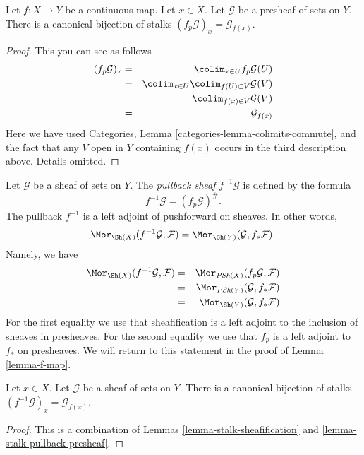 \begin{lemma}
\label{lemma-stalk-pullback-presheaf}
Let $f : X \to Y$ be a continuous map.
Let $x \in X$. Let $\mathcal{G}$ be a presheaf of sets on $Y$.
There is a canonical bijection of stalks
$(f_p\mathcal{G})_x = \mathcal{G}_{f(x)}$.
\end{lemma}

\begin{proof}
This you can see as follows
\begin{eqnarray*}
(f_p\mathcal{G})_x
& = &
\colim_{x \in U} f_p\mathcal{G}(U) \\
& = &
\colim_{x \in U} \colim_{f(U) \subset V} \mathcal{G}(V) \\
& = &
\colim_{f(x) \in V} \mathcal{G}(V) \\
& = &
\mathcal{G}_{f(x)}
\end{eqnarray*}
Here we have used
Categories, Lemma \ref{categories-lemma-colimits-commute},
and the fact that any $V$ open in $Y$ containing $f(x)$
occurs in the third description above. Details omitted.
\end{proof}

\noindent
Let $\mathcal{G}$ be a sheaf of sets on $Y$.
The {\it pullback sheaf} $f^{-1}\mathcal{G}$ is defined
by the formula
$$
f^{-1}\mathcal{G} = (f_p\mathcal{G})^\# .
$$
The pullback $f^{-1}$ is a left adjoint of
pushforward on sheaves. In other words,
$$
\Mor_{\Sh(X)}(f^{-1}\mathcal{G}, \mathcal{F})
=
\Mor_{\Sh(Y)}(\mathcal{G}, f_*\mathcal{F}).
$$
Namely, we have
\begin{eqnarray*}
\Mor_{\Sh(X)}(f^{-1}\mathcal{G}, \mathcal{F})
& = &
\Mor_{\textit{PSh}(X)}(f_p\mathcal{G}, \mathcal{F}) \\
& = &
\Mor_{\textit{PSh}(Y)}(\mathcal{G}, f_*\mathcal{F}) \\
& = &
\Mor_{\Sh(Y)}(\mathcal{G}, f_*\mathcal{F})
\end{eqnarray*}
For the first equality we use that sheafification is a left adjoint
to the inclusion of sheaves in presheaves. For the second equality
we use that $f_p$ is a left adjoint to $f_*$ on presheaves. We will return
to this statement in the proof of Lemma \ref{lemma-f-map}.

\begin{lemma}
\label{lemma-stalk-pullback}
Let $x \in X$. Let $\mathcal{G}$ be a sheaf of sets on $Y$.
There is a canonical bijection of stalks
$(f^{-1}\mathcal{G})_x = \mathcal{G}_{f(x)}$.
\end{lemma}

\begin{proof}
This is a combination of Lemmas \ref{lemma-stalk-sheafification}
and \ref{lemma-stalk-pullback-presheaf}.
\end{proof}


